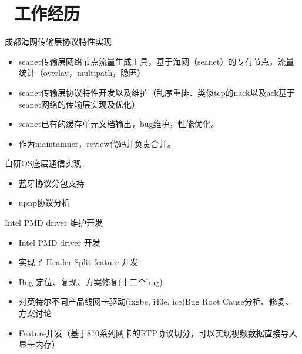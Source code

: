 \documentclass{resume}
\begin{document}


 
\section{\faUsers\ 工作经历}
\begin{onehalfspacing}
成都海网传输层协议特性实现
\begin{itemize}
  \item seanet传输层网络节点流量生成工具，基于海网（seanet）的专有节点，流量统计（overlay，multipath，隐匿）
  \item seanet传输层协议特性开发以及维护（乱序重排、类似tcp的nack以及ack基于seanet网络的传输层实现及优化）
  \item seanet已有的缓存单元文档输出，bug维护，性能优化。
  \item 作为maintainner，review代码并负责合并。
\end{itemize} 
\end{onehalfspacing}


\begin{onehalfspacing}
自研OS底层通信实现
\begin{itemize}
  \item 蓝牙协议分包支持
  \item upnp协议分析
\end{itemize} 
\end{onehalfspacing}

\begin{onehalfspacing}
Intel PMD driver 维护开发 
\begin{itemize}
	\item Intel PMD driver 开发
	\item 实现了 Header Split feature 开发
	\item Bug 定位、复现、方案修复(十二个bug)
	\item 对英特尔不同产品线网卡驱动(ixgbe, i40e, ice)Bug Root Cause分析、修复、方案讨论
	\item Feature开发（基于810系列网卡的RTP协议切分，可以实现视频数据直接导入显卡内存）
\end{itemize} 
\end{onehalfspacing}
\end{document}
